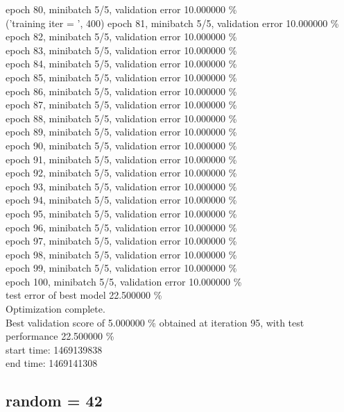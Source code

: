 \documentclass[a4paper]{article}
\begin{document}
epoch 80, minibatch 5/5, validation error 10.000000 \% \\
('training \@ iter = ', 400)
epoch 81, minibatch 5/5, validation error 10.000000 \% \\
epoch 82, minibatch 5/5, validation error 10.000000 \% \\
epoch 83, minibatch 5/5, validation error 10.000000 \% \\
epoch 84, minibatch 5/5, validation error 10.000000 \% \\
epoch 85, minibatch 5/5, validation error 10.000000 \% \\
epoch 86, minibatch 5/5, validation error 10.000000 \% \\
epoch 87, minibatch 5/5, validation error 10.000000 \% \\
epoch 88, minibatch 5/5, validation error 10.000000 \% \\
epoch 89, minibatch 5/5, validation error 10.000000 \% \\
epoch 90, minibatch 5/5, validation error 10.000000 \% \\
epoch 91, minibatch 5/5, validation error 10.000000 \% \\
epoch 92, minibatch 5/5, validation error 10.000000 \% \\
epoch 93, minibatch 5/5, validation error 10.000000 \% \\
epoch 94, minibatch 5/5, validation error 10.000000 \% \\
epoch 95, minibatch 5/5, validation error 10.000000 \% \\
epoch 96, minibatch 5/5, validation error 10.000000 \% \\
epoch 97, minibatch 5/5, validation error 10.000000 \% \\
epoch 98, minibatch 5/5, validation error 10.000000 \% \\
epoch 99, minibatch 5/5, validation error 10.000000 \% \\
epoch 100, minibatch 5/5, validation error 10.000000 \% \\
 test error of best model 22.500000 \% \\
Optimization complete. \\
Best validation score of 5.000000 \% obtained at iteration 95, with test performance 22.500000 \% \\
start time: 1469139838 \\
end time: 1469141308 \\

\subsection{random = 42}
\end{document}
